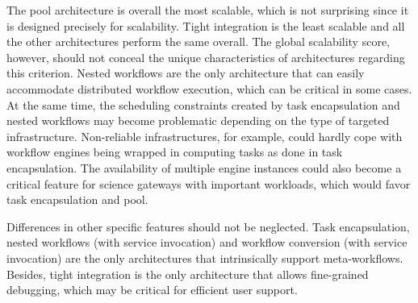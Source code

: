 \documentclass[preprint,3p,twocolumn]{elsarticle}
\begin{document}
The pool architecture is overall the most scalable, which is not
surprising since it is designed precisely for scalability. Tight
integration is the least scalable and all the other architectures
perform the same overall. The global scalability score, however,
should not conceal the unique characteristics of architectures regarding
this criterion. Nested workflows are the only architecture that can
easily accommodate distributed workflow execution, which can be
critical in some cases. At the same time, the scheduling constraints
created by task encapsulation and nested workflows may become problematic  depending on the type of targeted
infrastructure. Non-reliable infrastructures,
for example, could hardly cope with workflow engines being wrapped in
computing tasks as done in task encapsulation. The availability of
multiple engine instances could also become a critical feature for
science gateways with important workloads, which would favor task
encapsulation and pool.

Differences in other specific features should not be neglected. Task encapsulation, nested
workflows (with service invocation) and workflow conversion (with service
invocation) are the only architectures that intrinsically support meta-workflows. Besides,
tight integration is the only architecture that allows
fine-grained debugging, which may be
critical for efficient user support.
\end{document}
